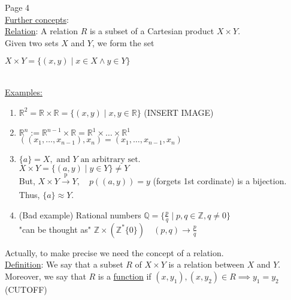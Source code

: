 \documentclass{article}
\begin{document}
\newpage
\begin{flushleft}
    Page 4 \\
    \vspace{1em}
    \underline{Further concepts}: \\
    \vspace{1em}
    \underline{Relation}: A relation $R$ is a subset of a Cartesian product $X \times Y$. \
    \vspace{1em} \\
    Given two sets $X$ and $Y$, we form the set \
    \vspace{0.5em} \\
    \centerline{ $X \times Y = \{(x,y) \mid x \in X \land y \in Y\}$ } \
    \vspace{0.5em} \\
    \underline{Examples:} \\
    \begin{enumerate}
        \item $\mathbb{R}^{2} = \mathbb{R} \times \mathbb{R} = \{(x,y) \mid x,y \in \mathbb{R}\}$ (INSERT IMAGE) \\
        \item  $\mathbb{R}^{n} := \mathbb{R}^{n-1} \times \mathbb{R} = \mathbb{R}^1\times \ldots \times \mathbb{R}^1$ 
            \vspace{0.5em} \\
            $((x_{1}, \ldots, x_{n-1}), x_{n}) = (x_{1}, \ldots, x_{n-1}, x_{n})$
            \vspace{0.5em} \\
        \item $\{a\} = X, \text{ and } Y \text{ an arbitrary set.}$ 
             \vspace{0.5em} \\
             $X \times Y = \{(a,y) \mid y \in Y\} \neq Y $
             \vspace{0.5em} \\
    
But, $X \times Y \xrightarrow[]{\text{p}} Y, \quad p((a,y)) = y$ (forgets 1st cordinate) is a bijection.\\
Thus, $\{a\} \approx Y$. \\
    
        \item (Bad example) Rational numbers $\mathbb{Q} = \{\frac{p}{q}\mid p,q \in \mathbb{Z}, q \neq 0\}$ \\
            "can be thought as" $\mathbb{Z} \times (\mathbb{Z}^* \{0\}) \quad (p,q) \rightarrow \frac{p}{q}$\\
\end{enumerate}
Actually, to make precise we need the concept of a relation. \\
    \vspace{0.5em} 
\underline{Definition}: We say that a subset $R$ of $X \times Y$ is a relation between $X$ and $Y$. Moreover, we say that $R$
 is a \underline{function} if $(x, y_1), (x, y_2) \in R \implies y_1=y_2$ (CUTOFF)\\
    
\end{flushleft}
\end{document}
